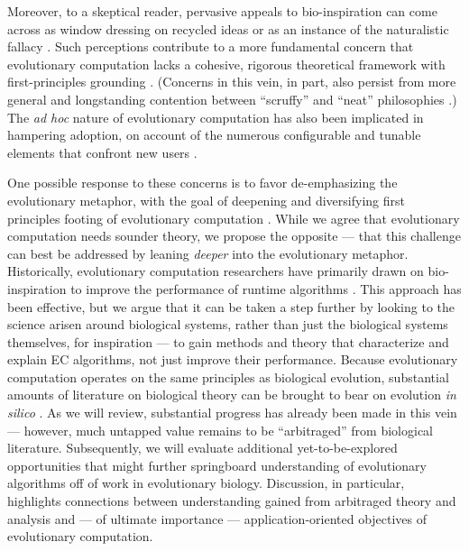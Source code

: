 Moreover, to a skeptical reader, pervasive appeals to bio-inspiration can come across as window dressing on recycled ideas or as an instance of the naturalistic fallacy \citep{wortmann2020does,sorensen2015metaheuristics}.
Such perceptions contribute to a more fundamental concern that evolutionary computation lacks a cohesive, rigorous theoretical framework with first-principles grounding \citep{worzel2003genetic}.
(Concerns in this vein, in part, also persist from more general and longstanding contention between ``scruffy'' and ``neat'' philosophies \citep[p.~16]{jones2008artificial, minsky1991logical}.)
The \textit{ad hoc} nature of evolutionary computation has also been implicated in hampering adoption, on account of the numerous configurable and tunable elements that confront new users \citep{oneil2010open}.

One possible response to these concerns is to favor de-emphasizing the evolutionary metaphor, with the goal of deepening and diversifying first principles footing of evolutionary computation \citep{moore2023evolution}.
While we agree that evolutionary computation needs sounder theory, we propose the opposite --- that this challenge can best be addressed by leaning \textit{deeper} into the evolutionary metaphor.
Historically, evolutionary computation researchers have primarily drawn on bio-inspiration to improve the performance of runtime algorithms \citep{banzhaf2006artificial,kumar2003biologically,mcphee2009developmental}.
This approach has been effective, but we argue that it can be taken a step further by looking to the science arisen around biological systems, rather than just the biological systems themselves, for inspiration --- to gain methods and theory that characterize and explain EC algorithms, not just improve their performance.
Because evolutionary computation operates on the same principles as biological evolution, substantial amounts of literature on biological theory can be brought to bear on evolution \textit{in silico} \citep{belew1996computation}.
As we will review, substantial progress has already been made in this vein --- however, much untapped value remains to be ``arbitraged'' from biological literature.
Subsequently, we will evaluate additional yet-to-be-explored opportunities that might further springboard understanding of evolutionary algorithms off of work in evolutionary biology.
Discussion, in particular, highlights connections between understanding gained from arbitraged theory and analysis and --- of ultimate importance --- application-oriented objectives of evolutionary computation.

